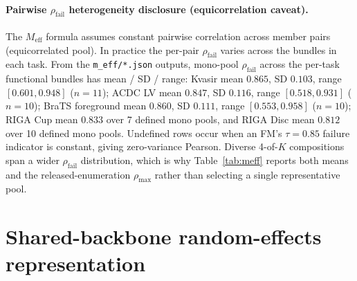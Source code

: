 \paragraph{Pairwise $\rho_{\mathrm{fail}}$ heterogeneity disclosure (equicorrelation caveat).} The $M_{\mathrm{eff}}$ formula assumes constant pairwise correlation across member pairs (equicorrelated pool). In practice the per-pair $\rho_{\mathrm{fail}}$ varies across the bundles in each task. From the \texttt{m\_eff/*.json} outputs, mono-pool $\rho_{\mathrm{fail}}$ across the per-task functional bundles has mean / SD / range:
Kvasir mean $0.865$, SD $0.103$, range $[0.601, 0.948]$ ($n{=}11$);
ACDC LV mean $0.847$, SD $0.116$, range $[0.518, 0.931]$ ($n{=}10$);
BraTS foreground mean $0.860$, SD $0.111$, range $[0.553, 0.958]$ ($n{=}10$);
RIGA Cup mean $0.833$ over 7 defined mono pools, and RIGA Disc mean $0.812$ over 10 defined mono pools. Undefined rows occur when an FM's $\tau{=}0.85$ failure indicator is constant, giving zero-variance Pearson. Diverse 4-of-$K$ compositions span a wider $\rho_{\mathrm{fail}}$ distribution, which is why Table~\ref{tab:meff} reports both means and the released-enumeration $\rho_{\max}$ rather than selecting a single representative pool.

\section{Shared-backbone random-effects representation}
\label{app:rand-effects}

